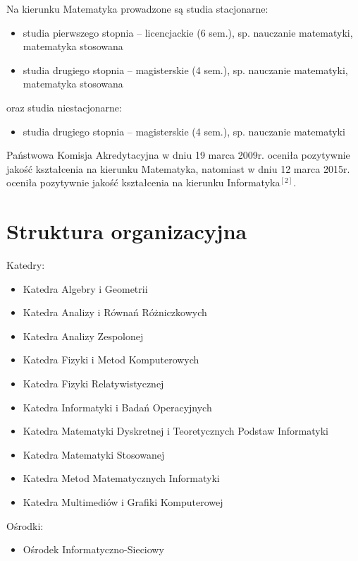 \documentclass[a4paper,12pt]{article}
\begin{document}
Na kierunku Matematyka prowadzone są studia stacjonarne:

\begin{itemize}
\item studia pierwszego stopnia – licencjackie (6 sem.), sp. nauczanie matematyki, matematyka stosowana
\item studia drugiego stopnia – magisterskie (4 sem.), sp. nauczanie matematyki, matematyka stosowana
\end{itemize}

oraz studia niestacjonarne:

\begin{itemize}
\item studia drugiego stopnia – magisterskie (4 sem.), sp. nauczanie matematyki
\end{itemize}

Państwowa Komisja Akredytacyjna w dniu 19 marca 2009r. oceniła pozytywnie jakość kształcenia na kierunku Matematyka, natomiast w dniu 12 marca 2015r. oceniła pozytywnie jakość kształcenia na kierunku Informatyka$^{[2]}$.

\section{Struktura organizacyjna}
Katedry:

\begin{itemize}
\item Katedra Algebry i Geometrii
\item Katedra Analizy i Równań Różniczkowych
\item Katedra Analizy Zespolonej
\item Katedra Fizyki i Metod Komputerowych
\item Katedra Fizyki Relatywistycznej
\item Katedra Informatyki i Badań Operacyjnych
\item Katedra Matematyki Dyskretnej i Teoretycznych Podstaw Informatyki
\item Katedra Matematyki Stosowanej
\item Katedra Metod Matematycznych Informatyki
\item Katedra Multimediów i Grafiki Komputerowej
\end{itemize}

Ośrodki:

\begin{itemize}
\item Ośrodek Informatyczno-Sieciowy
\end{itemize}
\end{document}
